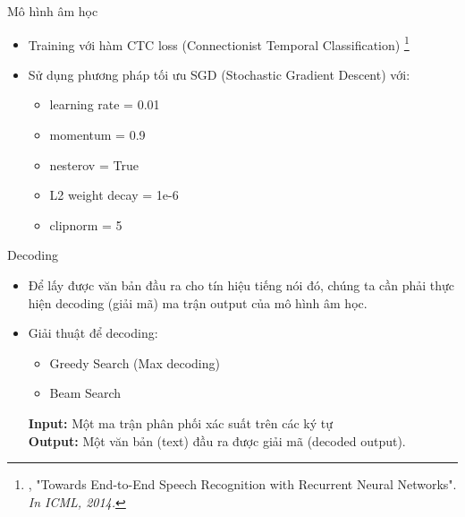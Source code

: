\documentclass[10pt,a4paper,openany]{beamer}
\begin{document}
	\begin{frame}{Mô hình âm học}  \pause
		\begin{itemize}
			\item Training với hàm CTC loss (Connectionist Temporal Classification) \footnote{, "Towards End-to-End Speech Recognition with Recurrent Neural Networks". \emph{\color{blue} In ICML, 2014.}} \newline  \pause
			\item Sử dụng phương pháp tối ưu SGD (Stochastic Gradient Descent) với:  \pause
			\begin{itemize}
				\item learning rate = 0.01
				\item momentum = 0.9
				\item nesterov = True
				\item L2 weight decay = 1e-6
				\item clipnorm = 5				
			\end{itemize}
		\end{itemize}
	\end{frame}
	
	\begin{frame}{Decoding} \pause
		\begin{itemize}
			\item Để lấy được văn bản đầu ra cho tín hiệu tiếng nói đó, chúng ta cần phải thực hiện decoding (giải mã) ma trận output của mô hình âm học. \newline \pause
			\item Giải thuật để decoding: \newline \pause
			\begin{itemize}
				\item Greedy Search (Max decoding) \newline  \pause%
				\item Beam Search \newline  \pause%
			\end{itemize} 
			\textbf{Input:} Một ma trận phân phối xác suất trên các ký tự \\  \pause
			\textbf{Output:} Một văn bản (text) đầu ra được giải mã (decoded output).
		\end{itemize}		
	\end{frame}
	
\end{document}
